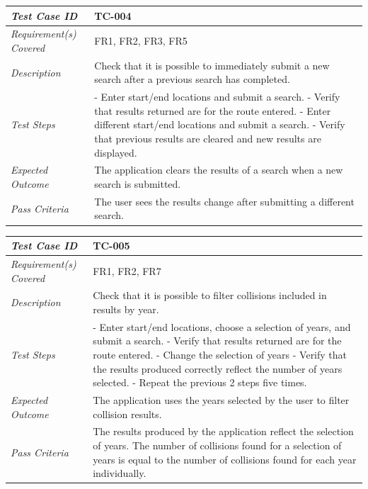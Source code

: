 \documentclass[authoryearcitations]{UoYCSproject}
\begin{document}
\begin{tabular}{| p{2.5cm} | p{11cm} |}
	\hline
	\textit{Test Case ID} & TC-004 \\ \hline
	\textit{Requirement(s) Covered} & FR1, FR2, FR3, FR5 \\ \hline
	\textit{Description} & Check that it is possible to immediately submit a new search after a previous search has completed. \\ \hline
	\textit{Test Steps}& - Enter start/end locations and submit a search.
	\newline - Verify that results returned are for the route entered.
	\newline - Enter different start/end locations and submit a search.
	\newline - Verify that previous results are cleared and new results are displayed.
 \\ \hline
	\textit{Expected Outcome} & The application clears the results of a search when a new search is submitted.  \\ \hline
	\textit{Pass Criteria} & The user sees the results change after submitting a different search.  \\ \hline
\end{tabular}

\begin{tabular}{| p{2.5cm} | p{11cm} |}
	\hline
	\textit{Test Case ID} & TC-005 \\ \hline
	\textit{Requirement(s) Covered} & FR1, FR2, FR7 \\ \hline
	\textit{Description} & Check that it is possible to filter collisions included in results by year. \\ \hline
	\textit{Test Steps}& - Enter start/end locations, choose a selection of years, and submit a search.
	\newline - Verify that results returned are for the route entered.
	\newline - Change the selection of years
	\newline - Verify that the results produced correctly reflect the number of years selected.
	\newline - Repeat the previous 2 steps five times.
 \\ \hline
	\textit{Expected Outcome} & The application uses the years selected by the user to filter collision results.  \\ \hline
	\textit{Pass Criteria} & The results produced by the application reflect the selection of years. The number of collisions found for a selection of years is equal to the number of collisions found for each year individually.  \\ \hline
\end{tabular}
\end{document}
